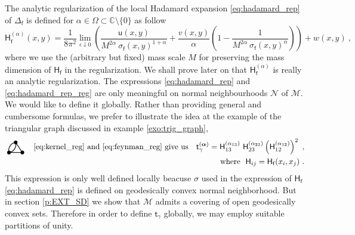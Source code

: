 \documentclass[11pt]{book}
\newcommand{\alphabd}{\boldsymbol{\alpha}}
\newcommand{\Mcal}{\mathcal{M}}
\newcommand{\Ncal}{\mathcal{N}}
\newcommand{\Cbb}{\mathbb{C}}
\newcommand{\Hsf}{\mathsf{H}}
\newcommand{\fsf}{\mathsf{f}}
\newcommand{\tsf}{\mathsf{t}}
\newcommand{\usf}{\mathsf{u}}
\theoremstyle{break}
\newcommand{\FtwoGoneHoneF}{\begin{tikzpicture}[thick,scale=1.5]
\useasboundingbox (-0.1,0.1) rectangle (0.5,0.4);
\filldraw (0,0) circle (1.3pt);
\filldraw (0.4,0) circle (1.3pt);
\filldraw (0.2,0.3) circle (1.3pt);
\draw (0,0) edge [out=105,in=185] node[above] {} (0.2,0.3);
\draw (0,0) edge [out=5,in=-75] node[above] {} (0.2,0.3);
\draw (0.4,0) -- (0.2,0.3);
\draw (0.4,0) -- (0,0);
\end{tikzpicture} }
\begin{document}
The analytic regularization of the local Hadamard expansion \ref{eq:hadamard_rep} of $\Delta_\fsf$ is defined for $\alpha \in \Omega \subset \Cbb \setminus \{0\}$ as follow 
%
\begin{equation}
\Hsf^{(\alpha)}_\fsf(x,y) = \frac{1}{8\pi^2} \lim_{\epsilon \downarrow 0} \left( \frac{\usf(x,y)}{M^{2\alpha} \ \sigma_\fsf(x,y)^{1+\alpha}} + \frac{v(x,y)}{\alpha} \left( 1 - \frac{1}{ M^{2\alpha} \ \sigma_\fsf(x,y)^{\alpha} } \right) \right) + w(x,y) \ ,
\label{eq:hadamard_rep_reg}
\end{equation}
%
where we use the (arbitrary but fixed) mass scale $M$ for preserving the mass dimension of $\Hsf_\fsf$ in the regularization. We shall prove later on that $\Hsf^{(\alpha)}_\fsf$ is really an analytic regularization. The expressions \eqref{eq:hadamard_rep} and \eqref{eq:hadamard_rep_reg} are only meaningful on normal neighbourhoods $\Ncal$ of $\Mcal$. We would like to define it globally. Rather than providing general and cumbersome formulas, we prefer to illustrate the idea at the example of the triangular graph discussed in example \ref{exo:trig_graph},
%
\begin{eqnarray*}
\FtwoGoneHoneF 
&& \mbox{\eqref{eq:kernel_reg} and \eqref{eq:feynman_reg} give us} \quad \tsf_\gamma^{(\alphabd)} = \Hsf^{(\alpha_{13})}_{13} \ \Hsf^{(\alpha_{23})}_{23} \left(\Hsf^{(\alpha_{12})}_{12}\right)^2 \ , \\
&& \mbox{ where } \ \Hsf_{ij} = \Hsf_\fsf(x_i,x_j) \ .
\end{eqnarray*}
%
This expression is only well defined locally beacuse $\sigma$ used in the expression of $\Hsf_\fsf$ \eqref{eq:hadamard_rep} is defined on geodesically convex normal neighborhood. But in section \ref{p:EXT_SD} we show that $\Mcal$ admits a covering of open geodesically convex sets. Therefore in order to define $\tsf_\gamma$ globally, we may employ suitable partitions of unity. 
\end{document}
